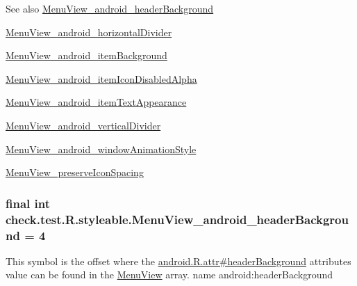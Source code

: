 \begin{DoxySeeAlso}{See also}
\hyperlink{classcheck_1_1test_1_1_r_1_1styleable_a4e4a179bc404d7aa3f2a2a031b3637e3}{Menu\+View\+\_\+android\+\_\+header\+Background} 

\hyperlink{classcheck_1_1test_1_1_r_1_1styleable_a46412e274f28015595ca468aa91c144f}{Menu\+View\+\_\+android\+\_\+horizontal\+Divider} 

\hyperlink{classcheck_1_1test_1_1_r_1_1styleable_a33a367daf559b4bb77461ec037d3e86f}{Menu\+View\+\_\+android\+\_\+item\+Background} 

\hyperlink{classcheck_1_1test_1_1_r_1_1styleable_ac4582a310c88c18ea4a50f11ff473f68}{Menu\+View\+\_\+android\+\_\+item\+Icon\+Disabled\+Alpha} 

\hyperlink{classcheck_1_1test_1_1_r_1_1styleable_ad1f162a33f4a61b0900eb474fd824ddb}{Menu\+View\+\_\+android\+\_\+item\+Text\+Appearance} 

\hyperlink{classcheck_1_1test_1_1_r_1_1styleable_a32c0f0f19e2ec8e866a3c03c63f95680}{Menu\+View\+\_\+android\+\_\+vertical\+Divider} 

\hyperlink{classcheck_1_1test_1_1_r_1_1styleable_ada6890b4f29ec20b02e8c982e454986d}{Menu\+View\+\_\+android\+\_\+window\+Animation\+Style} 

\hyperlink{classcheck_1_1test_1_1_r_1_1styleable_ad1b55b20b2ab6b61d05dd41ed2312ff2}{Menu\+View\+\_\+preserve\+Icon\+Spacing} 
\end{DoxySeeAlso}
\hypertarget{classcheck_1_1test_1_1_r_1_1styleable_a4e4a179bc404d7aa3f2a2a031b3637e3}{}
\subsubsection[{Menu\+View\+\_\+android\+\_\+header\+Background}]{\setlength{\rightskip}{0pt plus 5cm}final int check.\+test.\+R.\+styleable.\+Menu\+View\+\_\+android\+\_\+header\+Background = 4\hspace{0.3cm}{\ttfamily [static]}}\label{classcheck_1_1test_1_1_r_1_1styleable_a4e4a179bc404d7aa3f2a2a031b3637e3}
This symbol is the offset where the \hyperlink{}{android.\+R.\+attr\#header\+Background} attribute\textquotesingle{}s value can be found in the \hyperlink{classcheck_1_1test_1_1_r_1_1styleable_acb1b5275ffcfc132a3221b157fed1ff8}{Menu\+View} array.  name android\+:header\+Background \hypertarget{classcheck_1_1test_1_1_r_1_1styleable_a46412e274f28015595ca468aa91c144f}{}
